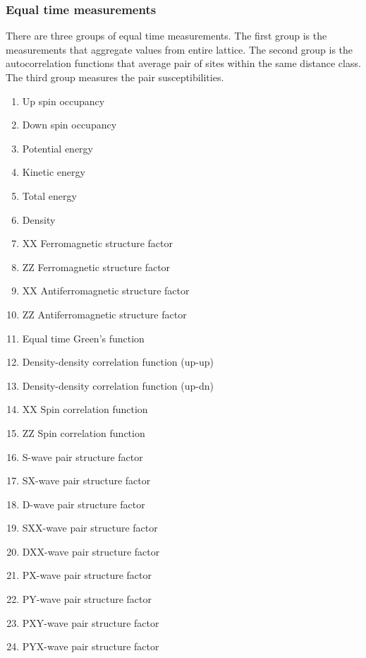 \documentclass[12pt]{article}
\begin{document}
\subsubsection{Equal time measurements}
There are three groups of equal time measurements. The first group is the measurements that aggregate values from entire lattice. The second group is the autocorrelation functions that average pair of sites within the same distance class. The third group measures the pair susceptibilities.
\begin{enumerate}
   \item Up spin occupancy
   \item Down spin occupancy
   \item Potential energy
   \item Kinetic energy
   \item Total energy
   \item Density
   \item XX Ferromagnetic structure factor
   \item ZZ Ferromagnetic structure factor
   \item XX Antiferromagnetic structure factor
   \item ZZ Antiferromagnetic structure factor
   \item Equal time Green's function
   \item Density-density correlation function (up-up)
   \item Density-density correlation function (up-dn)
   \item XX Spin correlation function
   \item ZZ Spin correlation function
   \item S-wave pair structure factor
   \item SX-wave pair structure factor
   \item D-wave pair structure factor
   \item SXX-wave pair structure factor
   \item DXX-wave pair structure factor
   \item PX-wave pair structure factor
   \item PY-wave pair structure factor
   \item PXY-wave pair structure factor
   \item PYX-wave pair structure factor
\end{enumerate}
\end{document}
